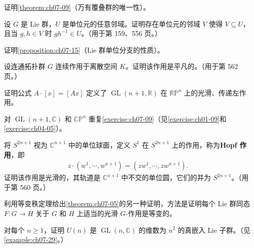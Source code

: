 \documentclass[../../main.tex]{subfiles}
\begin{document}
\begin{exercise}\label{exercise:ch07-05}
证明\cref{theorem:ch07-09}（万有覆叠群的唯一性）。
\end{exercise}

\begin{exercise}\label{exercise:ch07-06}
设 $G$ 是 Lie 群，$U$ 是单位元的任意邻域。证明存在单位元的邻域 $V$ 使得 $V\subseteq U$，且当 $g,h\in V$ 时 $gh^{-1}\in U$。（用于第 159、556 页。）
\end{exercise}

\begin{exercise}\label{exercise:ch07-07}
证明\cref{proposition:ch07-15}（Lie 群单位分支的性质）。
\end{exercise}

\begin{exercise}\label{exercise:ch07-08}
设连通拓扑群 $G$ 连续作用于离散空间 $K$。证明该作用是平凡的。（用于第 562 页。）
\end{exercise}

\begin{exercise}\label{exercise:ch07-09}
证明公式 $A\cdot[x]=[Ax]$ 定义了 $\operatorname{GL}(n+1,\mathbb{R})$ 在 $\mathbb{RP}^n$ 上的光滑、传递左作用。
\end{exercise}

\begin{exercise}\label{exercise:ch07-10}
对 $\operatorname{GL}(n+1,\mathbb{C})$ 和 $\mathbb{CP}^n$ 重复\cref{exercise:ch07-09}（见\cref{exercise:ch01-09}和\cref{exercise:ch04-05}）。
\end{exercise}

\begin{exercise}\label{exercise:ch07-11}
将 $S^{2n+1}$ 视为 $\mathbb{C}^{n+1}$ 中的单位球面，定义 $S^1$ 在 $S^{2n+1}$ 上的作用，称为\textbf{Hopf 作用}，即
\begin{align*}
z\cdot(w^1,\cdots ,w^{n+1})=(zw^1,\cdots ,zw^{n+1}).
\end{align*}
证明该作用是光滑的，其轨道是 $\mathbb{C}^{n+1}$ 中不交的单位圆，它们的并为 $S^{2n+1}$。（用于第 560 页。）
\end{exercise}

\begin{exercise}\label{exercise:ch07-12}
利用等变秩定理给出\cref{theorem:ch07-05}的另一种证明，方法是证明每个 Lie 群同态 $F\colon G\to H$ 关于 $G$ 和 $H$ 上适当的光滑 $G$-作用是等变的。
\end{exercise}

\begin{exercise}\label{exercise:ch07-13}
对每个 $n\geqslant1$，证明 $U(n)$ 是 $\operatorname{GL}(n,\mathbb{C})$ 的维数为 $n^2$ 的真嵌入 Lie 子群。（见\cref{example:ch07-29}。）
\end{exercise}
\end{document}
